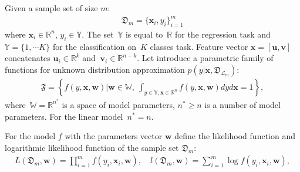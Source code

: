 \documentclass[
11pt,%
tightenlines,%
twoside,%
onecolumn,%
nofloats,%
nobibnotes,%
nofootinbib,%
superscriptaddress,%
noshowpacs,%
centertags]%
{revtex4}
\begin{document}
Given a sample set of size $m$:
\begin{equation}
\label{eq:ps:1}
\begin{aligned}
	\mathfrak{D}_{m} = \{\textbf{x}_i, y_i\}_{i = 1}^{m}
\end{aligned}
\end{equation}
where $\textbf{x}_i\in \mathbb{R}^{n}$, $y_i\in \mathbb{Y}$. The set~$\mathbb{Y}$ is equal to~$\mathbb{R}$ for the regression task and~$\mathbb{Y}=\{1,\cdots K\}$ for the classification on~$K$ classes task. Feature vector $\textbf{x} = [\textbf{u}, \textbf{v}]$ concatenates $\textbf{u}_i\in \mathbb{R}^{k}$ and $~\textbf{v}_i\in \mathbb{R}^{n-k}$.
Let introduce a parametric family of functions for unknown distribution approximation $p(y|\textbf{x}, \mathfrak{D}_{\mathcal{L}_{m}})$:
\begin{equation}
\label{eq:ps:3}
\begin{aligned}
	\mathfrak{F} = \left\{f\left(y,\textbf{x}, \textbf{w}\right)|\textbf{w}\in\mathbb{W},~\int_{y\in \mathbb{Y}, \textbf{x}\in\mathbb{R}^{n}}f\left(y, \textbf{x}, \textbf{w}\right)dyd\textbf{x}=1\right\},
\end{aligned}
\end{equation}
where~$\mathbb{W} = \mathbb{R}^{n^*}$ is a space of model parameters, $n^*\geq n$ is a number of model parameters. For the linear model~$n^*=n$.

For the model $f$ with the parameters vector $\textbf{w}$ define the likelihood function and logarithmic likelihood function of the sample set $\mathfrak{D}_{m}$:
\begin{equation}
\label{eq:ps:4}
\begin{aligned}
	L\left(\mathfrak{D}_{m}, \textbf{w}\right) = \prod_{i=1}^{m} f\left(y_{i},\textbf{x}_{i}, \textbf{w}\right),\quad l\left(\mathfrak{D}_{m}, \textbf{w}\right) = \sum_{i=1}^{m} \log f\left(y_i,\textbf{x}_{i}, \textbf{w}\right),
\end{aligned}
\end{equation}
\end{document}
